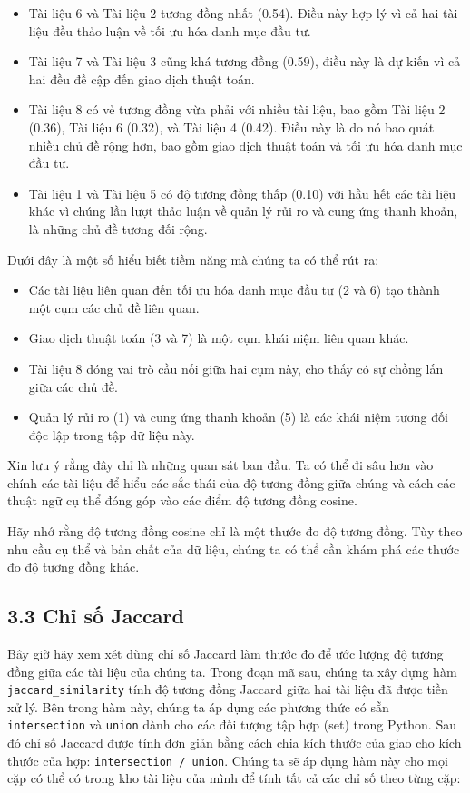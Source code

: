 \begin{itemize}
  \item Tài liệu 6 và Tài liệu 2 tương đồng nhất (0.54). Điều này hợp lý vì cả hai tài liệu đều thảo luận về tối ưu hóa danh mục đầu tư.
  \item Tài liệu 7 và Tài liệu 3 cũng khá tương đồng (0.59), điều này là dự kiến vì cả hai đều đề cập đến giao dịch thuật toán.
  \item Tài liệu 8 có vẻ tương đồng vừa phải với nhiều tài liệu, bao gồm Tài liệu 2 (0.36), Tài liệu 6 (0.32), và Tài liệu 4 (0.42). Điều này là do nó bao quát nhiều chủ đề rộng hơn, bao gồm giao dịch thuật toán và tối ưu hóa danh mục đầu tư.
  \item Tài liệu 1 và Tài liệu 5 có độ tương đồng thấp (0.10) với hầu hết các tài liệu khác vì chúng lần lượt thảo luận về quản lý rủi ro và cung ứng thanh khoản, là những chủ đề tương đối rộng.
\end{itemize}

Dưới đây là một số hiểu biết tiềm năng mà chúng ta có thể rút ra:

\begin{itemize}
  \item Các tài liệu liên quan đến tối ưu hóa danh mục đầu tư (2 và 6) tạo thành một cụm các chủ đề liên quan.
  \item Giao dịch thuật toán (3 và 7) là một cụm khái niệm liên quan khác.
  \item Tài liệu 8 đóng vai trò cầu nối giữa hai cụm này, cho thấy có sự chồng lấn giữa các chủ đề.
  \item Quản lý rủi ro (1) và cung ứng thanh khoản (5) là các khái niệm tương đối độc lập trong tập dữ liệu này.
\end{itemize}

Xin lưu ý rằng đây chỉ là những quan sát ban đầu. Ta có thể đi sâu hơn vào chính các tài liệu để hiểu các sắc thái của độ tương đồng giữa chúng và cách các thuật ngữ cụ thể đóng góp vào các điểm độ tương đồng cosine.

Hãy nhớ rằng độ tương đồng cosine chỉ là một thước đo độ tương đồng. Tùy theo nhu cầu cụ thể và bản chất của dữ liệu, chúng ta có thể cần khám phá các thước đo độ tương đồng khác.

\subsection*{3.3 Chỉ số Jaccard}

Bây giờ hãy xem xét dùng chỉ số Jaccard làm thước đo để ước lượng độ tương đồng giữa các tài liệu của chúng ta. Trong đoạn mã sau, chúng ta xây dựng hàm \texttt{jaccard\_similarity} tính độ tương đồng Jaccard giữa hai tài liệu đã được tiền xử lý. Bên trong hàm này, chúng ta áp dụng các phương thức có sẵn \texttt{intersection} và \texttt{union} dành cho các đối tượng tập hợp (set) trong Python. Sau đó chỉ số Jaccard được tính đơn giản bằng cách chia kích thước của giao cho kích thước của hợp: \texttt{intersection / union}. Chúng ta sẽ áp dụng hàm này cho mọi cặp có thể có trong kho tài liệu của mình để tính tất cả các chỉ số theo từng cặp:

